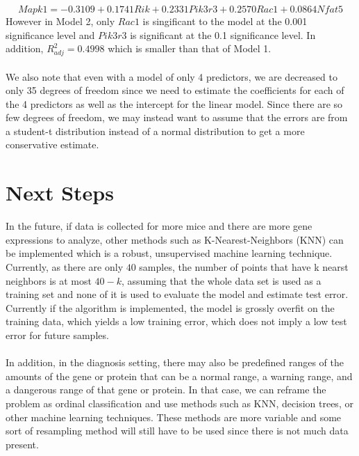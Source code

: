 \documentclass{article}
\begin{document}
\begin{equation}
	Mapk1=-0.3109+0.1741Rik+0.2331Pik3r3+0.2570Rac1+0.0864Nfat5
	\label{eq:Model2}
\end{equation}
However in Model 2, only $Rac1$ is singificant to the model at the 0.001 significance level and $Pik3r3$ is significant at the 0.1 significance level.  In addition, $R^2_{adj} = 0.4998$ which is smaller than that of Model 1.\\
\null\\
We also note that even with a model of only 4 predictors, we are decreased to only 35 degrees of freedom since we need to estimate the coefficients for each of the 4 predictors as well as the intercept for the linear model.  Since there are so few degrees of freedom, we may instead want to assume that the errors are from a student-t distribution instead of a normal distribution to get a more conservative estimate.

\section{Next Steps}
In the future, if data is collected for more mice and there are more gene expressions to analyze, other methods such as K-Nearest-Neighbors (KNN) can be implemented which is a robust, unsupervised machine learning technique.  Currently, as there are only $40$ 
samples, the number of points that have k nearst neighbors is at most $40-k$, assuming that the whole data set is used as a training 
set and none of it is used to evaluate the model and estimate test error.  Currently if the algorithm is implemented, the 
model is grossly overfit on the training data, which yields a low training error, which does not imply a low test error for future samples.\\
\null\\
In addition, in the diagnosis setting, there may also be predefined ranges of the amounts of the gene or protein that can be a normal range, a warning range, and a dangerous range of that gene or protein.  In that case, we can reframe the problem as ordinal classification and use methods such as KNN, decision trees, or other machine learning techniques.  These methods are more variable and some sort of resampling method will still have to be used since there is not much data present. 
\end{document}
